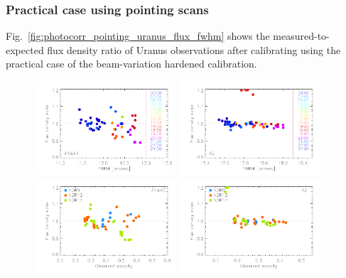 \subsubsection{Practical case using pointing scans}
\label{se:cal_pointings}


Fig.~\ref{fig:photocorr_pointing_uranus_flux_fwhm} shows the
measured-to-expected flux density ratio of Uranus observations after
calibrating using the practical case of the beam-variation
hardened calibration. 

\begin{figure}[ht!]
\begin{center}
\includegraphics[clip=true,width=0.47\textwidth]{Figures/Calibration/Photocorr/plot_flux_density_ratio_primaryphotocorr_pointing_1mm.pdf}
\includegraphics[clip=true,width=0.47\textwidth]{Figures/Calibration/Photocorr/plot_flux_density_ratio_primaryphotocorr_pointing_a2.pdf}
\includegraphics[clip=true,width=0.47\textwidth]{Figures/Calibration/Photocorr/plot_flux_density_ratio_obstau_primaryphotocorr_pointing_1mm.pdf}
\includegraphics[clip=true,width=0.47\textwidth]{Figures/Calibration/Photocorr/plot_flux_density_ratio_obstau_primaryphotocorr_pointing_a2.pdf}

\end{center}
\end{figure}
